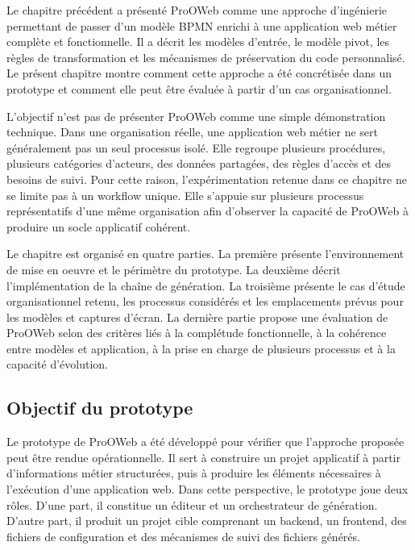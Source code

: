\label{chap:mise-oeuvre-evaluation-prooweb}


Le chapitre précédent a présenté ProOWeb comme une approche d'ingénierie permettant de passer d'un modèle BPMN enrichi à une application web métier complète et fonctionnelle. Il a décrit les modèles d'entrée, le modèle pivot, les règles de transformation et les mécanismes de préservation du code personnalisé. Le présent chapitre montre comment cette approche a été concrétisée dans un prototype et comment elle peut être évaluée à partir d'un cas organisationnel.

L'objectif n'est pas de présenter ProOWeb comme une simple démonstration technique. Dans une organisation réelle, une application web métier ne sert généralement pas un seul processus isolé. Elle regroupe plusieurs procédures, plusieurs catégories d'acteurs, des données partagées, des règles d'accès et des besoins de suivi. Pour cette raison, l'expérimentation retenue dans ce chapitre ne se limite pas à un workflow unique. Elle s'appuie sur plusieurs processus représentatifs d'une même organisation afin d'observer la capacité de ProOWeb à produire un socle applicatif cohérent.

Le chapitre est organisé en quatre parties. La première présente l'environnement de mise en oeuvre et le périmètre du prototype. La deuxième décrit l'implémentation de la chaîne de génération. La troisième présente le cas d'étude organisationnel retenu, les processus considérés et les emplacements prévus pour les modèles et captures d'écran. La dernière partie propose une évaluation de ProOWeb selon des critères liés à la complétude fonctionnelle, à la cohérence entre modèles et application, à la prise en charge de plusieurs processus et à la capacité d'évolution.

\label{sec:chap4-environnement}

\subsection{Objectif du prototype}

Le prototype de ProOWeb a été développé pour vérifier que l'approche proposée peut être rendue opérationnelle. Il sert à construire un projet applicatif à partir d'informations métier structurées, puis à produire les éléments nécessaires à l'exécution d'une application web. Dans cette perspective, le prototype joue deux rôles. D'une part, il constitue un éditeur et un orchestrateur de génération. D'autre part, il produit un projet cible comprenant un backend, un frontend, des fichiers de configuration et des mécanismes de suivi des fichiers générés.

